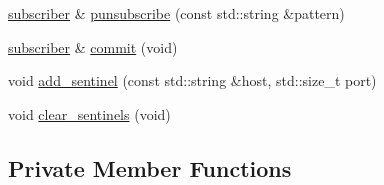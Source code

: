 \begin{DoxyCompactItemize}
\item 
\hyperlink{classcpp__redis_1_1subscriber}{subscriber} \& \hyperlink{classcpp__redis_1_1subscriber_a26edc7dcf87ddc8734fac04878ca307a}{punsubscribe} (const std\+::string \&pattern)
\item 
\hyperlink{classcpp__redis_1_1subscriber}{subscriber} \& \hyperlink{classcpp__redis_1_1subscriber_abbf600802ed93b82323185eec5719ecb}{commit} (void)
\item 
void \hyperlink{classcpp__redis_1_1subscriber_a10584e201abe4e701b70d078b3a676fc}{add\+\_\+sentinel} (const std\+::string \&host, std\+::size\+\_\+t port)
\item 
void \hyperlink{classcpp__redis_1_1subscriber_ac8f371c14866842cdda7cf1ee5eee2b8}{clear\+\_\+sentinels} (void)
\end{DoxyCompactItemize}
\subsection*{Private Member Functions}
